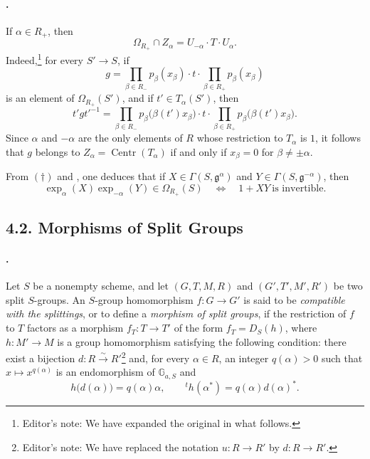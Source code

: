 \paragraph{.}
If \(\alpha\in R_+\), then
\[
  \tag{\(\dagger\)}\label{sga3:xxii:subsection:4-1:equation:dagger}
  \Omega_{R_+}\cap Z_\alpha
  =
  U_{-\alpha}\mathbin{\cdot}T\mathbin{\cdot}U_\alpha.
\]
Indeed,\footnote{Editor's note: We have expanded the original in
what follows.} for every \(S'\to S\), if
\[
  g=
  \prod_{\beta\in R_-}p_\beta(x_\beta)
  \mathbin{\cdot}t\mathbin{\cdot}
  \prod_{\beta\in R_+}p_\beta(x_\beta)
\]
is an element of \(\Omega_{R_+}(S')\), and if
\(t'\in T_\alpha(S')\), then
\[
  t'gt'^{-1}
  =
  \prod_{\beta\in R_-}p_\beta\bigl(\beta(t')x_\beta\bigr)
  \mathbin{\cdot}t\mathbin{\cdot}
  \prod_{\beta\in R_+}p_\beta\bigl(\beta(t')x_\beta\bigr).
\]
Since \(\alpha\) and \(-\alpha\) are the only elements of \(R\)
whose restriction to \(T_\alpha\) is \(1\), it follows that \(g\)
belongs to \(Z_\alpha=\operatorname{Centr}(T_\alpha)\) if and only
if \(x_\beta=0\) for \(\beta\ne\pm\alpha\).

From \((\dagger)\) and , one deduces that if
\(X\in\Gamma(S,\mathfrak g^\alpha)\) and
\(Y\in\Gamma(S,\mathfrak g^{-\alpha})\), then
\[
  \exp_\alpha(X)\exp_{-\alpha}(Y)\in\Omega_{R_+}(S)
  \quad\Longleftrightarrow\quad
  1+XY\ \text{is invertible}.
\]

\subsection*{4.2. Morphisms of Split Groups}

\paragraph{.}
Let \(S\) be a nonempty scheme, and let
\((G,T,M,R)\) and \((G',T',M',R')\) be two split \(S\)-groups.
An \(S\)-group homomorphism \(f:G\to G'\) is said to be
\emph{compatible with the splittings}, or to define a
\emph{morphism of split groups}, if the restriction of \(f\) to
\(T\) factors as a morphism \(f_T:T\to T'\) of the form
\(f_T=D_S(h)\), where \(h:M'\to M\) is a group homomorphism
satisfying the following condition: there exist a bijection
\(d:R\xrightarrow{\sim}R'\)\footnote{Editor's note: We have
replaced the notation \(u:R\to R'\) by \(d:R\to R'\).} and, for
every \(\alpha\in R\), an integer \(q(\alpha)>0\) such that
\(x\mapsto x^{q(\alpha)}\) is an endomorphism of
\(\mathbb G_{a,S}\) and
\[
  h\bigl(d(\alpha)\bigr)=q(\alpha)\alpha,
  \qquad
  {}^t h(\alpha^*)=q(\alpha)d(\alpha)^*.
\]

